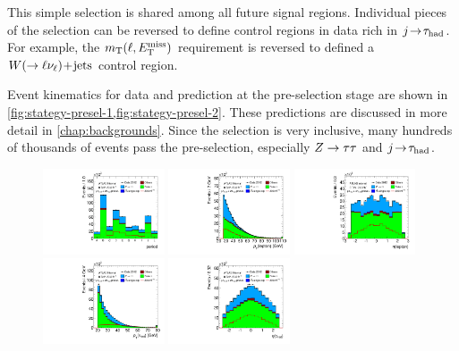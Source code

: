 This simple selection is shared among all future signal regions. Individual pieces of the selection can be reversed to define control regions in data rich in $j\!\rightarrow\!\tau_\text{had}$. For example, the $m_\text{T}(\ell, E_{\mathrm{T}}^{\mathrm{miss}})$ requirement is reversed to defined a $W (\rightarrow \ell\nu_\ell)\!+\!\text{jets}$ control region.

Event kinematics for data and prediction at the pre-selection stage are shown in \cref{fig:stategy-presel-1,fig:stategy-presel-2}. These predictions are discussed in more detail in \cref{chap:backgrounds}. Since the selection is very inclusive, many hundreds of thousands of events pass the pre-selection, especially $Z\rightarrow\tau\tau$ and $j\!\rightarrow\!\tau_\text{had}$.

\clearpage

\begin{figure}[tp]
  \centering
  \includegraphics[width=0.32\textwidth]{figures/presel/period}
  \includegraphics[width=0.32\textwidth]{figures/presel/lep-pt-hi}
  \includegraphics[width=0.32\textwidth]{figures/presel/lep-eta} \\
  \includegraphics[width=0.32\textwidth]{figures/presel/tau-pt}
  \includegraphics[width=0.32\textwidth]{figures/presel/tau-eta}

\end{figure}
